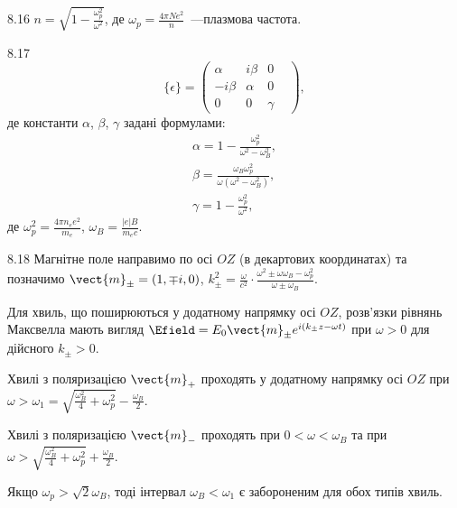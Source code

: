 \begin{Solution}{8.{16}}
	$n = \sqrt{1 - \frac{\omega_p^2}{\omega^2}}$, де $\omega_p = \frac{4\pi N e^2}{n}$~---плазмова частота.
\end{Solution}
\begin{Solution}{8.{17}}
	\begin{equation*}
		\{ \epsilon \}  = \left( {\begin{array}{*{20}{c}}
				\alpha       & {i\beta } & 0      & \\
				{ - i\beta } & \alpha    & 0      & \\
				0            & 0         & \gamma &
			\end{array}} \right),
	\end{equation*}
	де константи $\alpha$, $\beta$, $\gamma$ задані формулами:
	\begin{align*}
		\alpha =  1 - \frac{\omega_p^2}{\omega ^2 - \omega _B^2},           \\
		\beta = \frac{\omega_B\omega_p^2}{\omega(\omega ^2 - \omega _B^2)}, \\
		\gamma = 1 - \frac{\omega _p^2}{\omega ^2},
	\end{align*}
	де $\omega _p^2 = \frac{4\pi n_e e^2}{m_e}$, $\omega_B = \frac{\left| e \right|B}{m_ec}$.
\end{Solution}
\begin{Solution}{8.{18}}
    Магнітне поле направимо по осі $OZ$ (в декартових координатах) та позначимо \(\vect{m}_{\pm} = (1, \mp i,0)\), \(k_\pm^2 = \frac{\omega }{c^2} \cdot \frac{\omega^2 \pm \omega \omega_B - \omega_p^2}{\omega  \pm \omega_B}\).

    Для хвиль, що поширюються у додатному напрямку осі $OZ$, розв’язки рівнянь Максвелла мають вигляд $\Efield = E_0\vect{m}_{\pm} e^{i(k_\pm z - \omega t)}$ при $\omega > 0$ для дійсного $k_{\pm} >0$.

    Хвилі з поляризацією $\vect{m}_+$ проходять у додатному напрямку осі $OZ$ при \(\omega  > \omega_1 = \sqrt {\frac{{\omega_B^2}}{4} + \omega_p^2}  - \frac{\omega _B}{2}\).

    Хвилі з поляризацією $\vect{m}_-$ проходять при \(0<\omega<\omega_B\)  та при\\\(\omega  > \sqrt {\frac{\omega_B^2}{4} + \omega_p^2}  + \frac{\omega _B}{2}\).

    Якщо \({\omega _p} > \sqrt 2 {\omega _B}\), тоді  інтервал \(\omega_B  <  \omega_1 \)  є забороненим для обох типів хвиль.
\end{Solution}
